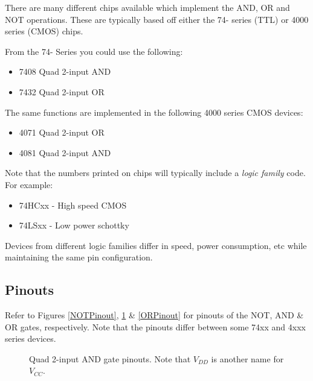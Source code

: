 \documentclass{UoNMCHA}
\numberwithin{equation}{section}
\begin{document}
There are many different chips available which implement the AND, OR and NOT operations. These are typically based off either the 74- series (TTL) or 4000 series (CMOS) chips.

From the 74- Series you could use the following:

\begin{itemize}
    \item 7408 Quad 2-input AND
    \item 7432 Quad 2-input OR
\end{itemize}

The same functions are implemented in the following 4000 series CMOS devices:

\begin{itemize}
    \item 4071 Quad 2-input OR
    \item 4081 Quad 2-input AND
\end{itemize}

Note that the numbers printed on chips will typically include a \textit{logic family} code. For example:

\begin{itemize}
    \item 74HCxx - High speed CMOS
    \item 74LSxx - Low power schottky
\end{itemize}

Devices from different logic families differ in speed, power consumption, etc while maintaining the same pin configuration.

\subsection{Pinouts}

 Refer to Figures \ref{NOTPinout}, \ref{ANDPinout} \& \ref{ORPinout} for pinouts of the NOT, AND \& OR gates, respectively. Note that the pinouts differ between some 74xx and 4xxx series devices.

\begin{figure}[h!]
\centering
    \qquad
    \caption{Quad 2-input AND gate pinouts. Note that $V_{DD}$ is another name for $V_{CC}$.}
    \label{ANDPinout}
\end{figure}
\end{document}
